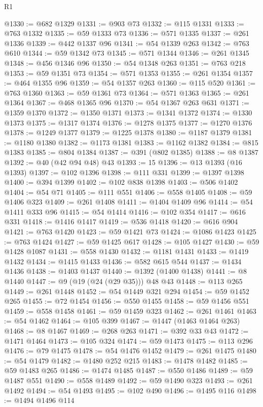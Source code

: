 \begin{lexlean}{R1}
\begin{coremodule}
@1330 := @682 @1329
@1331 := @903 @73
@1332 := @115 @1331
@1333 := @763 @1332
@1335 := @59 @1333 @73
@1336 := @571 @1335
@1337 := @261 @1336
@1339 := @442 @1337 @96
@1341 := @54 @1339 @263
@1342 := @763 @610
@1344 := @59 @1342 @73
@1345 := @571 @1344
@1346 := @261 @1345
@1348 := @456 @1346 @96
@1350 := @54 @1348 @263
@1351 := @763 @218
@1353 := @59 @1351 @73
@1354 := @571 @1353
@1355 := @261 @1354
@1357 := @464 @1355 @96
@1359 := @54 @1357 @263
@1360 := @115 @520
@1361 := @763 @1360
@1363 := @59 @1361 @73
@1364 := @571 @1363
@1365 := @261 @1364
@1367 := @468 @1365 @96
@1370 := @54 @1367 @263 @631
@1371 := @1359 @1370
@1372 := @1350 @1371
@1373 := @1341 @1372
@1374 := @1330 @1373
@1375 := @1317 @1374
@1376 := @1278 @1375
@1377 := @1270 @1376
@1378 := @1249 @1377
@1379 := @1225 @1378
@1380 := @1187 @1379
@1381 := @1180 @1380
@1382 := @1173 @1381
@1383 := @1162 @1382
@1384 := @815 @1383
@1385 := @804 @1384
@1387 := @391 (@802 @1385)
@1388 := @8 @1387
@1392 := @40 (@42 @94 @48) @43
@1393 := 15
@1396 := @13 @1393 (@16 @1393)
@1397 := @102 @1396
@1398 := @111 @331
@1399 := @1397 @1398
@1400 := @394 @1399
@1402 := @102 @838 @1398
@1403 := @506 @1402
@1404 := @54 @71
@1405 := @111 @551
@1406 := @558 @1405
@1408 := @59 @1406 @323
@1409 := @261 @1408
@1411 := @1404 @1409 @96
@1414 := @54 @1411 @333 @96
@1415 := @54 @1414
@1416 := @102 @354
@1417 := @616 @331
@1418 := @1416 @1417
@1419 := @536 @1418
@1420 := @616 @904
@1421 := @763 @1420
@1423 := @59 @1421 @73
@1424 := @1086 @1423
@1425 := @763 @1424
@1427 := @59 @1425 @617
@1428 := @105 @1427
@1430 := @59 @1428 @1087
@1431 := @558 @1430
@1432 := @1181 @1431
@1433 := @1419 @1432
@1434 := @1415 @1433
@1436 := @582 @615 @544
@1437 := @1434 @1436
@1438 := @1403 @1437
@1440 := @1392 (@1400 @1438)
@1441 := @8 @1440
@1447 := @9 (@19 (@24 (@29 @35))) @48 @43
@1448 := @113 @265
@1449 := @261 @1448
@1452 := @54 @1449 @321 @294
@1454 := @59 @1452 @265
@1455 := @72 @1454
@1456 := @550 @1455
@1458 := @59 @1456 @551
@1459 := @558 @1458
@1461 := @59 @1459 @323
@1462 := @261 @1461
@1463 := @54 @1462
@1464 := @105 @399
@1467 := @1447 (@1463 @1464 @263)
@1468 := @8 @1467
@1469 := @268 @263
@1471 := @392 @33 @43
@1472 := @1471 @1464
@1473 := @105 @324
@1474 := @59 @1473
@1475 := @113 @296
@1476 := @79 @1475
@1478 := @54 @1476 @1452
@1479 := @261 @1475
@1480 := @54 @1479
@1482 := @1480 @252 @215
@1483 := @1478 @1482
@1485 := @59 @1483 @265
@1486 := @1474 @1485
@1487 := @550 @1486
@1489 := @59 @1487 @551
@1490 := @558 @1489
@1492 := @59 @1490 @323
@1493 := @261 @1492
@1494 := @54 @1493
@1495 := @102 @490
@1496 := @1495 @116
@1498 := @1494 @1496 @114

\end{coremodule}
\end{lexlean}
